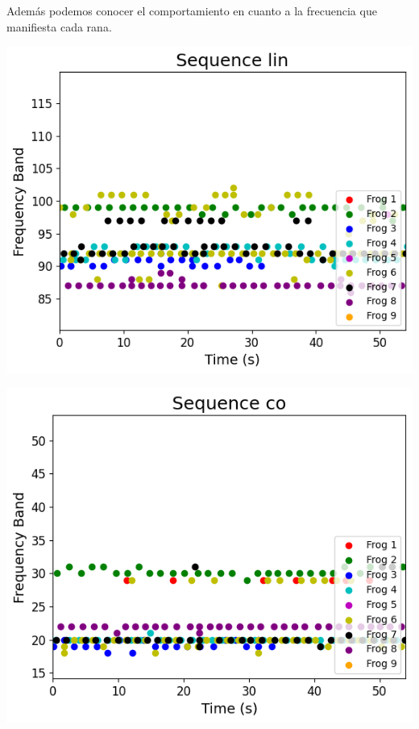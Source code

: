 \documentclass[a0,portrait]{a0poster}
\begin{document}
\begin{multicols}{3}
Además podemos conocer el comportamiento en cuanto a la frecuencia que manifiesta cada rana.
\begin{center}\vspace{1cm}
    \begin{minipage}{0.45\linewidth}
        \includegraphics[width=\linewidth]{assets/frequencylin.png}
    \end{minipage}
    \hspace{0.05\linewidth}
    \begin{minipage}{0.45\linewidth}
        \includegraphics[width=\linewidth]{assets/frequencyco.png}
    \end{minipage}
\end{center}\vspace{0.1cm}


\end{multicols}
\end{document}
